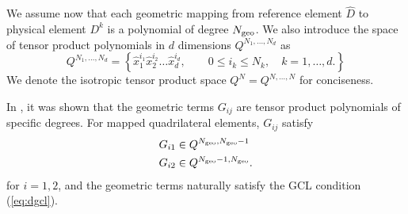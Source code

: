\documentclass{svjour3}                     %
\renewcommand{\hat}{\widehat}
\newcommand{\diag}[1]{{\rm diag}\LRp{#1}}
\newcommand{\LRp}[1]{\left( #1 \right)}
\newcommand{\LRc}[1]{\left\{ #1 \right\}}
\begin{document}
We assume now that each geometric mapping from reference element $\hat{D}$ to physical element $D^k$ is a polynomial of degree $N_{\rm geo}$.  We also introduce the space of tensor product polynomials in $d$ dimensions $Q^{N_1,\ldots, N_d}$ as
\[
Q^{N_1,\ldots, N_d} = \LRc{ \hat{x}_1^{i_1}\hat{x}_2^{i_2}\ldots\hat{x}_d^{i_d}, \qquad 0\leq i_k \leq N_k, \quad k = 1,\ldots,d.}
\]
We denote the isotropic tensor product space $Q^N= Q^{N,\ldots,N}$ for conciseness.  

In \cite{chan2019skew}, it was shown that the geometric terms $G_{ij}$ are tensor product polynomials of specific degrees.  For mapped quadrilateral elements, $G_{ij}$ satisfy
\begin{align*}
&G_{i1} \in Q^{N_{\rm geo},N_{\rm geo}-1}\\
&G_{i2} \in Q^{N_{\rm geo}-1,N_{\rm geo}}.
\end{align*}
for $i = 1,2$, and the geometric terms naturally satisfy the GCL condition (\ref{eq:dgcl}).  
\end{document}
